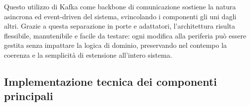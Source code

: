\documentclass[10pt]{article}
\begin{document}
    Questo utilizzo di Kafka come backbone di comunicazione sostiene la natura asincrona ed event-driven del sistema, svincolando i componenti gli uni dagli altri. Grazie a questa separazione in porte e adattatori, l'architettura risulta flessibile, manutenibile e facile da testare: ogni modifica alla periferia può essere gestita senza impattare la logica di dominio, preservando nel contempo la coerenza e la semplicità di estensione all'intero sistema.


    \subsection{Implementazione tecnica dei componenti principali}
\end{document}
